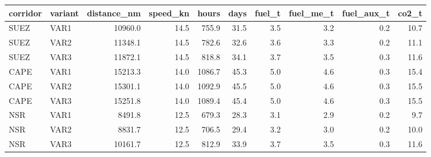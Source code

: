 \begin{tabular}{llrrrrrrrr}
\toprule
corridor & variant &  distance\_nm &  speed\_kn &  hours &  days &  fuel\_t &  fuel\_me\_t &  fuel\_aux\_t &  co2\_t \\
\midrule
    SUEZ &    VAR1 &      10960.0 &      14.5 &  755.9 &  31.5 &     3.5 &        3.2 &         0.2 &   10.7 \\
    SUEZ &    VAR2 &      11348.1 &      14.5 &  782.6 &  32.6 &     3.6 &        3.3 &         0.2 &   11.1 \\
    SUEZ &    VAR3 &      11872.1 &      14.5 &  818.8 &  34.1 &     3.7 &        3.5 &         0.3 &   11.6 \\
    CAPE &    VAR1 &      15213.3 &      14.0 & 1086.7 &  45.3 &     5.0 &        4.6 &         0.3 &   15.4 \\
    CAPE &    VAR2 &      15301.1 &      14.0 & 1092.9 &  45.5 &     5.0 &        4.6 &         0.3 &   15.5 \\
    CAPE &    VAR3 &      15251.8 &      14.0 & 1089.4 &  45.4 &     5.0 &        4.6 &         0.3 &   15.5 \\
     NSR &    VAR1 &       8491.8 &      12.5 &  679.3 &  28.3 &     3.1 &        2.9 &         0.2 &    9.7 \\
     NSR &    VAR2 &       8831.7 &      12.5 &  706.5 &  29.4 &     3.2 &        3.0 &         0.2 &   10.0 \\
     NSR &    VAR3 &      10161.7 &      12.5 &  812.9 &  33.9 &     3.7 &        3.5 &         0.3 &   11.6 \\
\bottomrule
\end{tabular}
